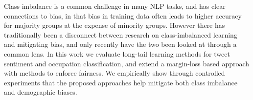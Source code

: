 Class imbalance is a common challenge in many NLP tasks, and has clear connections to bias, in that bias in training data often leads to higher accuracy for majority groups at the expense of minority groups. However there has traditionally been a disconnect between research on class-imbalanced learning and mitigating bias, and only recently have the two been looked at through a common lens. In this work we evaluate long-tail learning methods for tweet sentiment and occupation classification, and extend a margin-loss based approach with methods to enforce fairness. We empirically show through controlled experiments that the proposed approaches help mitigate both class imbalance and demographic biases.
